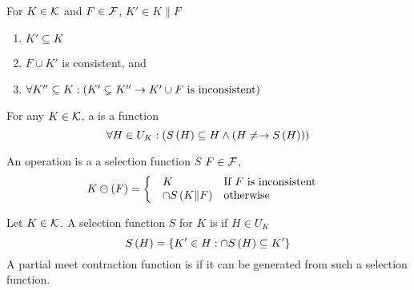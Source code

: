 \begin{defi}
For $K\in\mathcal{K}$ and $F\in\mathcal{F}$, $K'\in K\|F$ \iffTx{}
\begin{enumerate}
 \item $K'\subseteq K$
 \item $F\cup K'$ is consistent, and
 \item $\forall K''\subseteq K:\left( K'\subsetneq K''\rightarrow K'\cup F\mbox{ is inconsistent}\right)$
\end{enumerate}
\cite{conf/ijcai/ZhangCZC97}
\end{defi}

\begin{defi}
For any $K\in\mathcal{K}$, a  is a function  \stTx{}
\begin{equation}
\forall H\in U_K:\brak{\fun{S}{H}\subseteq H\wedge\brak{H\neq\empty\rightarrow\fun{S}{H}}}
\end{equation}
\cite{conf/ijcai/ZhangCZC97}
\end{defi}

\begin{defi}
An operation  is a  \iffTx{} \teTx{} a selection function $S$ \stTx{} \fanTx{} $F\in\mathcal{F}$,
\begin{equation}
K\ominus\left(F\right)=\left\{\begin{array}{l}\begin{array}{ll}
K&\mbox{If $F$ is inconsistent}\\
\cap S\left(K\|F\right)&\mbox{otherwise}
\end{array}\end{array}\right.
\end{equation}
\cite{conf/ijcai/ZhangCZC97}
\end{defi}

\begin{defi}
Let $K\in\mathcal{K}$. A selection function $S$ for $K$ is  if \faTx{} $H\in U_K$
\begin{equation}
S\left(H\right)=\left\{ K'\in H:\cap S\left(H\right)\subseteq K'\right\}
\end{equation}
A partial meet contraction function is  if it can be generated from such a selection function.
\cite{conf/ijcai/ZhangCZC97}
\end{defi}

